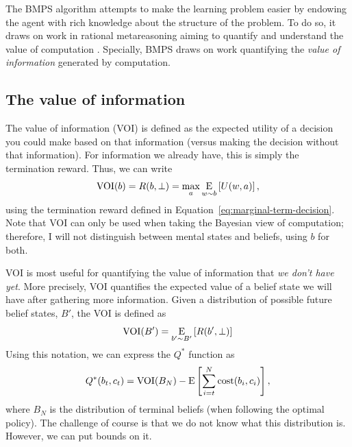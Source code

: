 The BMPS algorithm attempts to make the learning problem easier by endowing the agent with rich knowledge about the structure of the problem. To do so, it draws on work in rational metareasoning aiming to quantify and understand the value of computation \citep{matheson1968economic,horvitz1987reasoning,russell1991principles}. Specially, BMPS draws on work quantifying the \emph{value of information} generated by computation. 

\subsection{The value of information}\label{sec:voi}

The value of information (VOI) is defined as the expected utility of a decision you could make based on that information (versus making the decision without that information). For information we already have, this is simply the termination reward. Thus, we can write
%
\begin{equation}\label{eq:main-voi}
  \VOI(b) = R(b, \bot) = \max_a \expectunder{U(w, a)}{w \sim b},
\end{equation}
using the termination reward defined in Equation~\ref{eq:marginal-term-decision}. Note that VOI can only be used when taking the Bayesian view of computation; therefore, I will not distinguish between mental states and beliefs, using $b$ for both.

VOI is most useful for quantifying the value of information that \emph{we don't have yet}. More precisely, VOI quantifies the expected value of a belief state we will have after gathering more information. Given a distribution of possible future belief states, $B'$, the VOI is defined as
%
\begin{equation}
  \VOI(B') = \expectunder{R(b', \bot)}{b' \sim B'}
\end{equation}
%
Using this notation, we can express the $Q^*$ function as
%
\begin{equation}\label{eq:Q-VOI}
  Q^*(b_t, c_t) = 
    \VOI(B_N) - \E\left[\sum_{i=t}^{\tmax} \cost(b_i, c_i) \right],
\end{equation}
where $B_N$ is the distribution of terminal beliefs (when following the optimal policy). The challenge of course is that we do not know what this distribution is. However, we can put bounds on it.

